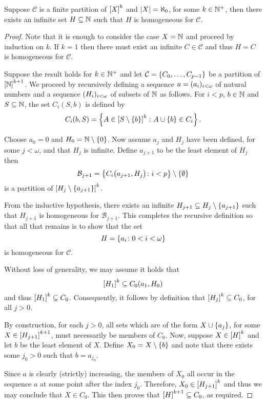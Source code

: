 \begin{thm}
	Suppose $\mathcal{C}$ is a finite partition of $\subsets{k}{X}$ and
	$\card{X}=\aleph_0$, for some $k\in\posnats$, then there exists an infinite
	set $H\subseteq\nats$ such that $H$ is homogeneous for $\mathcal{C}$.
\end{thm}
\begin{proof}
	Note that it is enough to consider the case $X=\nats$ and proceed by
	induction on $k$. If $k=1$ then there must exist an infinite
	$C\in\mathcal{C}$ and thus $H=C$ is homogeneous for $\mathcal{C}$.

	Suppose the result holds for $k\in\posnats$ and let
	$\mathcal{C}=\set{C_0,\dotsc,C_{p-1}}$ be a partition of
	$\subsets{k+1}{\nats}$.  We proceed by recursively defining a sequence
	$a=\family{a_i}{i<\omega}$ of natural numbers and a sequence
	$\family{H_i}{i<\omega}$ of subsets of $\nats$ as follows.  For $i<p$,
	$b\in\nats$ and $S\subseteq\nats$, the set $C_i(S,b)$ is defined by
	\begin{equation}
		C_i(b,S)=\setbuild{A\in\subsets{k}{S\setminus\set{b}}}{A\cup\set{b}\in
		C_i}.
	\end{equation}

	Choose $a_0=0$ and $H_0=\nats\setminus\set{0}$.  Now assume $a_j$ and $H_j$
	have been defined, for some $j<\omega$, and that $H_j$ is infinite.  Define
	$a_{j+1}$ to be the least element of $H_j$ then
	\begin{equation}
		\mathcal{B}_{j+1}=\setbuild{C_i\big(a_{j+1},H_j\big)}{
		i<p}\setminus\set{\emptyset}
	\end{equation}
	is a partition of $\subsets{k}{H_j\setminus\set{a_{j+1}}}$.

	From the inductive hypothesis, there exists an infinite $H_{j+1}\subseteq
	H_j\setminus\set{a_{j+1}}$ such that $H_{j+1}$ is homogeneous for
	$\mathcal{B}_{j+1}$.  This completes the recursive definition so that all that
	remains is to show that the set
	\begin{equation}
		H=\setbuild{a_i}{0<i<\omega}
	\end{equation}
	is homogeneous for $\mathcal{C}$.

	Without loss of generality, we may assume it holds that
	\begin{equation}
		\subsets{k}{H_1}\subseteq C_0(a_1,H_0)
	\end{equation}
	and thus $\subsets{k}{H_1}\subseteq C_0$.  Consequently, it follows by
	definition that $\subsets{k}{H_j}\subseteq C_0$, for all $j>0$.

	By construction, for each $j>0$, all sets which are of the form
	$X\cup\set{a_j}$, for some $X\in\subsets{k+1}{H_{j+1}}$, must necessarily be
	members of $C_0$.  Now, suppose $X\in\subsets{k}{H}$ and let $b$ be the
	least element of $X$.  Define $X_0=X\setminus\set{b}$ and note that there
	exists some $j_0>0$ such that $b=a_{j_0}$.

	Since $a$ is clearly (strictly) increasing, the members of $X_0$ all occur
	in the sequence $a$ at some point after the index $j_0$. Therefore,
	$X_0\in\subsets{k}{H_{j+1}}$ and thus we may conclude that $X\in C_0$.  This
	then proves that $\subsets{k+1}{H}\subseteq C_0$, as required.
\end{proof}

